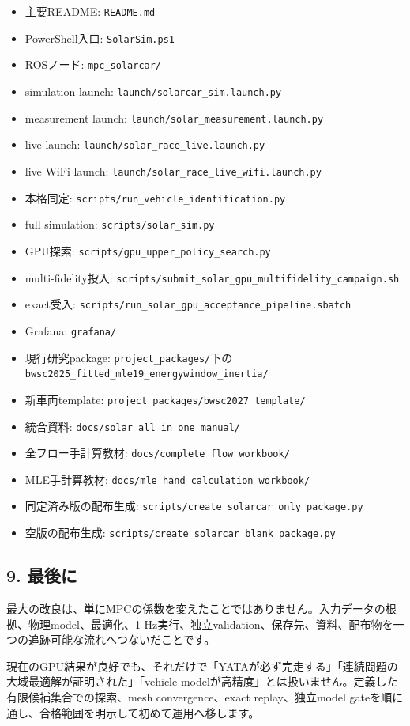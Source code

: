 \documentclass[
  japanese,
  a4paper,
  11pt]{article}
\providecommand{\tightlist}{%
  \setlength{\itemsep}{0pt}\setlength{\parskip}{0pt}}
\begin{document}
\begin{itemize}
\tightlist
\item
  主要README: \texttt{README.md}
\item
  PowerShell入口: \texttt{SolarSim.ps1}
\item
  ROSノード: \texttt{mpc\_solarcar/}
\item
  simulation launch: \texttt{launch/solarcar\_sim.launch.py}
\item
  measurement launch: \texttt{launch/solar\_measurement.launch.py}
\item
  live launch: \texttt{launch/solar\_race\_live.launch.py}
\item
  live WiFi launch: \texttt{launch/solar\_race\_live\_wifi.launch.py}
\item
  本格同定: \texttt{scripts/run\_vehicle\_identification.py}
\item
  full simulation: \texttt{scripts/solar\_sim.py}
\item
  GPU探索: \texttt{scripts/gpu\_upper\_policy\_search.py}
\item
  multi-fidelity投入:
  \texttt{scripts/submit\_solar\_gpu\_multifidelity\_campaign.sh}
\item
  exact受入:
  \texttt{scripts/run\_solar\_gpu\_acceptance\_pipeline.sbatch}
\item
  Grafana: \texttt{grafana/}
\item
  現行研究package:
  \texttt{project\_packages/}下の\texttt{bwsc2025\_fitted\_mle19\_energywindow\_inertia/}
\item
  新車両template: \texttt{project\_packages/bwsc2027\_template/}
\item
  統合資料: \texttt{docs/solar\_all\_in\_one\_manual/}
\item
  全フロー手計算教材: \texttt{docs/complete\_flow\_workbook/}
\item
  MLE手計算教材: \texttt{docs/mle\_hand\_calculation\_workbook/}
\item
  同定済み版の配布生成:
  \texttt{scripts/create\_solarcar\_only\_package.py}
\item
  空版の配布生成: \texttt{scripts/create\_solarcar\_blank\_package.py}
\end{itemize}

\subsection{9. 最後に}\label{9-ux6700ux5f8cux306b}

最大の改良は、単にMPCの係数を変えたことではありません。入力データの根拠、物理model、最適化、1
Hz実行、独立validation、保存先、資料、配布物を一つの追跡可能な流れへつないだことです。

現在のGPU結果が良好でも、それだけで「YATAが必ず完走する」「連続問題の大域最適解が証明された」「vehicle
modelが高精度」とは扱いません。定義した有限候補集合での探索、mesh
convergence、exact replay、独立model
gateを順に通し、合格範囲を明示して初めて運用へ移します。
\end{document}
